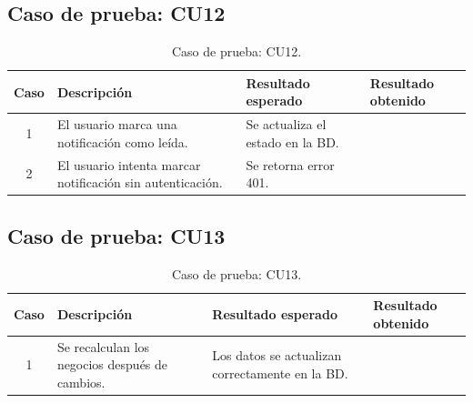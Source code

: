 
\subsection{Caso de prueba: CU12}

\begin{table}[H]
\centering
\label{tab:cu12_white_test}
\renewcommand{\arraystretch}{1.3}
\begin{tabular}{|c|p{5cm}|p{6cm}|p{2.5cm}|}
\hline
\rowcolor[RGB]{217,217,217}
\textbf{Caso} & \textbf{Descripción} & \textbf{Resultado esperado} & \textbf{Resultado obtenido} \\
\hline

1 &
El usuario marca una notificación como leída. &
Se actualiza el estado en la BD. &
 \\
\hline

2 &
El usuario intenta marcar notificación sin autenticación. &
Se retorna error 401. &
 \\
\hline

\end{tabular}
\caption{Caso de prueba: CU12.}
\end{table}


\subsection{Caso de prueba: CU13}

\begin{table}[H]
\centering
\label{tab:cu13_white_test}
\renewcommand{\arraystretch}{1.3}
\begin{tabular}{|c|p{5cm}|p{6cm}|p{2.5cm}|}
\hline
\rowcolor[RGB]{217,217,217}
\textbf{Caso} & \textbf{Descripción} & \textbf{Resultado esperado} & \textbf{Resultado obtenido} \\
\hline

1 &
Se recalculan los negocios después de cambios. &
Los datos se actualizan correctamente en la BD. &
 \\
\hline

\end{tabular}
\caption{Caso de prueba: CU13.}
\end{table}


